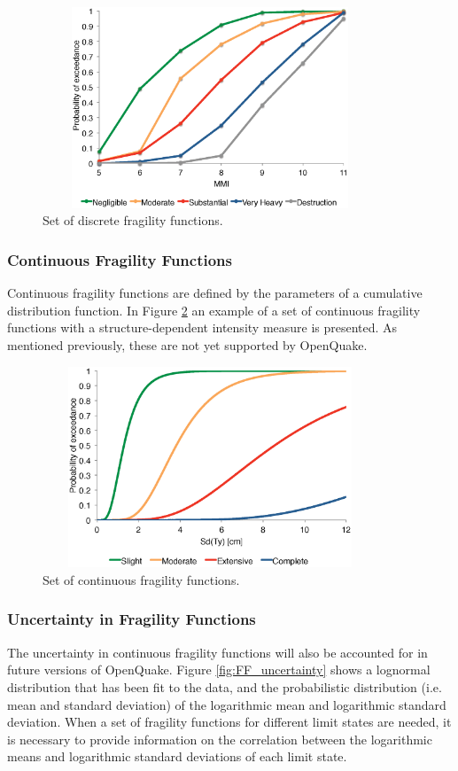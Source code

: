 \begin{figure}[ht]
\centering
\includegraphics[width=10cm,height=6cm]{./Figures/Part_Risk/FFDiscrete.eps}
\caption{Set of discrete fragility functions.}
\label{fig:FFDiscrete}
\end{figure}

\subsubsection{Continuous Fragility Functions}
Continuous fragility functions are defined by the parameters of a cumulative distribution function. In Figure \ref{fig:FFcontinuous} an example of a set of continuous fragility functions with a structure-dependent intensity measure is presented. As mentioned previously, these are not yet supported by OpenQuake.

\begin{figure}[ht]
\centering
\includegraphics[width=10cm,height=6cm]{./Figures/Part_Risk/FFContinuous.eps}
\caption{Set of continuous fragility functions.}
\label{fig:FFcontinuous}
\end{figure}

\subsubsection{Uncertainty in Fragility Functions}
The uncertainty in continuous fragility functions will also be accounted for in future versions of OpenQuake. Figure \ref{fig:FF_uncertainty} shows a lognormal distribution that has been fit to the data, and the probabilistic distribution (i.e. mean and standard deviation) of the logarithmic mean and logarithmic standard deviation. When a set of fragility functions for different limit states are needed, it is necessary to provide information on the correlation between the logarithmic means and logarithmic standard deviations of each limit state.

